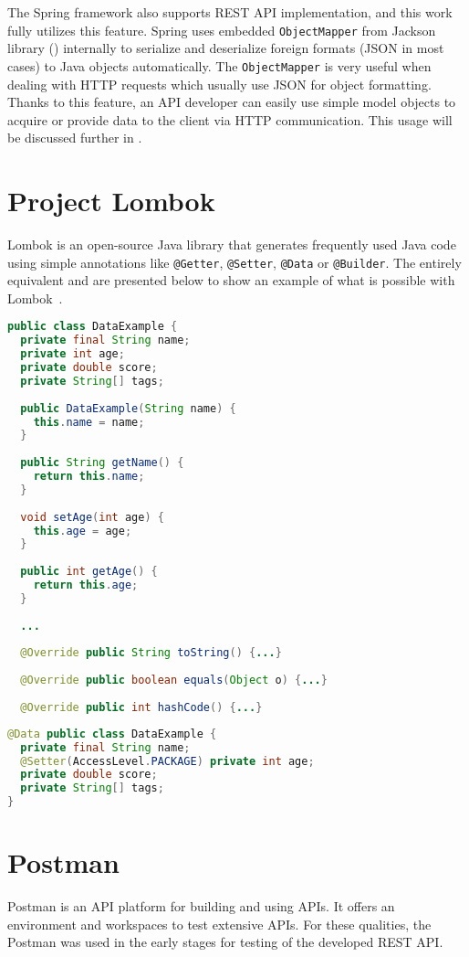 The Spring framework also supports REST API implementation, and this work fully utilizes this feature.
Spring uses embedded \texttt{Object\-Mapper} from Jackson library () internally to serialize and deserialize foreign formats (JSON in most cases) to Java objects automatically. The \texttt{ObjectMapper} is very useful when dealing with HTTP requests which usually use JSON for object formatting. Thanks to this feature, an API developer can easily use simple model objects to acquire or provide data to the client via HTTP communication.
This usage will be discussed further in .


\section{Project Lombok} \label{sec:lombok}
Lombok is an open-source Java library that generates frequently used Java code using simple annotations like \texttt{@Getter}, \texttt{@Setter}, \texttt{@Data} or \texttt{@Builder}.
The entirely equivalent  and  are presented below to show an example of what is possible with Lombok~\cite{lombok}.
\begin{lstlisting}[language=Java, caption=Vanilla Java, label=lst:vanilla]
public class DataExample {
  private final String name;
  private int age;
  private double score;
  private String[] tags;
  
  public DataExample(String name) {
    this.name = name;
  }
  
  public String getName() {
    return this.name;
  }
  
  void setAge(int age) {
    this.age = age;
  }
  
  public int getAge() {
    return this.age;
  }
  
  ...
  
  @Override public String toString() {...}
  
  @Override public boolean equals(Object o) {...}
  
  @Override public int hashCode() {...}
\end{lstlisting}
\begin{lstlisting}[language=Java, caption=Java with Lombok, label=lst:lombok]
@Data public class DataExample {
  private final String name;
  @Setter(AccessLevel.PACKAGE) private int age;
  private double score;
  private String[] tags;
}
\end{lstlisting}


\section{Postman} \label{sec:postman}
Postman is an API platform for building and using APIs. It offers an environment and workspaces to test extensive APIs.
For these qualities, the Postman was used in the early stages for testing of the developed REST API.



